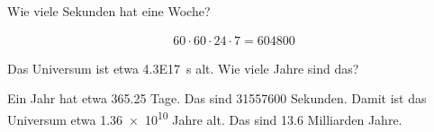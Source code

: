 
\begin{aufgabe}
	Wie viele Sekunden hat eine Woche?
	\begin{loesung}
		\begin{eqnarray*}
			60\cdot60\cdot24\cdot7=\num{604800}
		\end{eqnarray*}
	\end{loesung}
\end{aufgabe}
\begin{aufgabe}
	Das Universum ist etwa \SI{4.3E17}{s} alt. Wie viele Jahre sind das?
	\begin{loesung}
		Ein Jahr hat etwa \num{365.25} Tage. Das sind \num{31557600} Sekunden. 
		Damit ist das Universum etwa \num{1.36e+10} Jahre alt. Das sind \num{13.6} Milliarden Jahre.
	\end{loesung}
\end{aufgabe}
